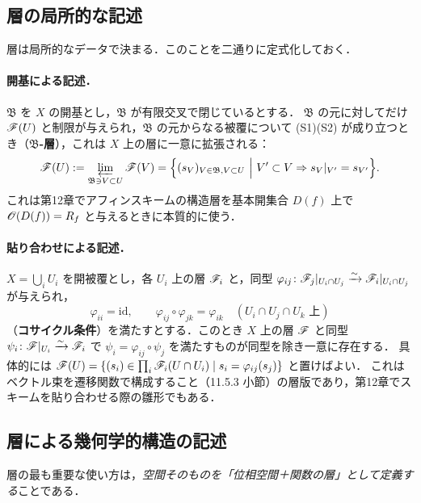 \subsection{層の局所的な記述}

層は局所的なデータで決まる．このことを二通りに定式化しておく．

\paragraph{開基による記述．}
$\mathfrak{B}$ を $X$ の開基とし，$\mathfrak{B}$ が有限交叉で閉じているとする．
$\mathfrak{B}$ の元に対してだけ $\mathscr{F}(U)$ と制限が与えられ，$\mathfrak{B}$ の元からなる被覆について (S1)(S2) が成り立つとき（\textbf{$\mathfrak{B}$-層}），これは $X$ 上の層に一意に拡張される：
\[
  \mathscr{F}(U) := \varprojlim_{\mathfrak{B}\ni V\subset U}\mathscr{F}(V)
  =\Big\{(s_V)_{V\in\mathfrak{B},V\subset U}\ \Big|\ V'\subset V \Rightarrow s_V|_{V'}=s_{V'}\Big\}.
\]
これは第12章でアフィンスキームの構造層を基本開集合 $D(f)$ 上で $\mathscr{O}(D(f))=R_f$ と与えるときに本質的に使う．

\paragraph{貼り合わせによる記述．}
$X=\bigcup_iU_i$ を開被覆とし，各 $U_i$ 上の層 $\mathscr{F}_i$ と，同型 $\varphi_{ij}\colon\mathscr{F}_j|_{U_i\cap U_j}\xrightarrow{\sim}\mathscr{F}_i|_{U_i\cap U_j}$ が与えられ，
\begin{equation}\label{eq:ch11-cocycle-sheaf}
  \varphi_{ii}=\mathrm{id},\qquad
  \varphi_{ij}\circ\varphi_{jk}=\varphi_{ik}\quad (U_i\cap U_j\cap U_k \text{ 上})
\end{equation}
（\textbf{コサイクル条件}）を満たすとする．このとき $X$ 上の層 $\mathscr{F}$ と同型 $\psi_i\colon\mathscr{F}|_{U_i}\xrightarrow{\sim}\mathscr{F}_i$ で $\psi_i=\varphi_{ij}\circ\psi_j$ を満たすものが同型を除き一意に存在する．
具体的には $\mathscr{F}(U)=\{(s_i)\in\prod_i\mathscr{F}_i(U\cap U_i)\mid s_i=\varphi_{ij}(s_j)\}$ と置けばよい．
これはベクトル束を遷移関数で構成すること（11.5.3 小節）の層版であり，第12章でスキームを貼り合わせる際の雛形でもある．

\subsection{層による幾何学的構造の記述}

層の最も重要な使い方は，\emph{空間そのものを「位相空間＋関数の層」として定義する}ことである．

